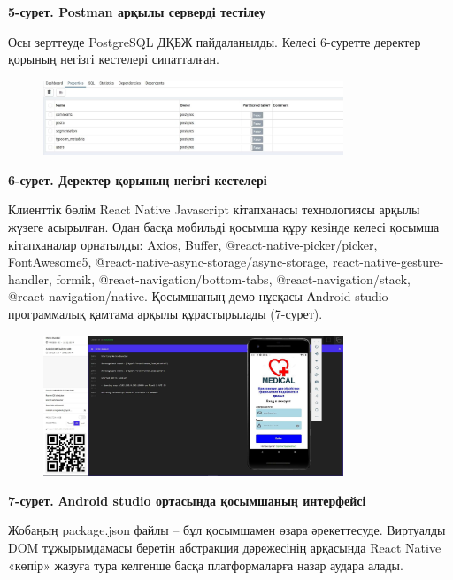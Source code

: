 {\bfseries 5-сурет. Postman арқылы серверді тестілеу}

Осы зерттеуде PostgreSQL ДҚБЖ пайдаланылды. Келесі 6-суретте деректер
қорының негізгі кестелері сипатталған.

\begin{figure}[H]
	\centering
	\includegraphics[width=0.8\textwidth]{assets/197}
	\caption*{}
\end{figure}

{\bfseries 6-сурет. Деректер қорының негізгі кестелері}

Клиенттік бөлім React Native Javascript кітапханасы технологиясы арқылы
жүзеге асырылған. Одан басқа мобильді қосымша құру кезінде келесі
қосымша кітапханалар орнатылды: Axios, Buffer,
@react-native-picker/picker, FontAwesome5,
@react-native-async-storage/async-storage, react-native-gesture-handler,
formik, @react-navigation/bottom-tabs, @react-navigation/stack,
@react-navigation/native. Қосымшаның демо нұсқасы Аndroid studio
программалық қамтама арқылы құрастырылады (7-сурет).

\begin{figure}[H]
	\centering
	\includegraphics[width=0.8\textwidth]{assets/198}
	\caption*{}
\end{figure}

{\bfseries 7-сурет. Аndroid studio ортасында қосымшаның интерфейсі}

Жобаңың package.json файлы -- бұл қосымшамен өзара әрекеттесуде.
Виртуалды DOM тұжырымдамасы беретін абстракция дәрежесінің арқасында
React Native «көпір» жазуға тура келгенше басқа платформаларға назар
аудара алады.

